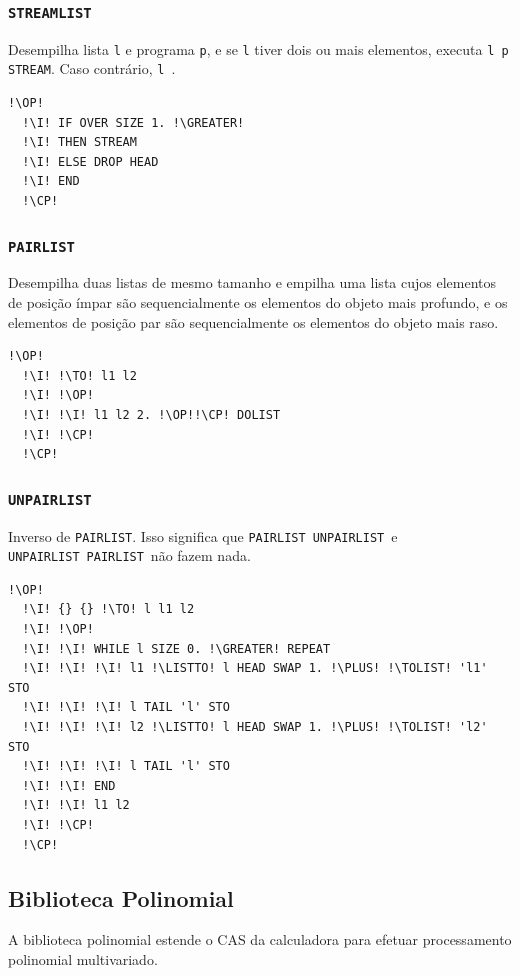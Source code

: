 \documentclass[12pt,a4paper]{report}
\newcommand{\kwd}[1]{\texttt{\textcolor{keyword}{#1}}}
\newcommand{\I}{\enspace\textcolor{indent}\vrule\hspace{2pt}}
\newcommand{\GREATER}{\kwd{$>$}}   %
\newcommand{\PLUS}{\kwd{+}}   %
\newcommand{\TOLIST}{\kwd{$\rightarrow$LIST}} %
\newcommand{\STREAM}{\kwd{STREAM}} %
\newcommand{\STREAMLIST}{\kwd{STREAMLIST}}   %
\newcommand{\PAIRLIST}{\kwd{PAIRLIST}}   %
\newcommand{\UNPAIRLIST}{\kwd{UNPAIRLIST}}   %
\newcommand{\OP}{\kwd{$\ll$}}   %
\newcommand{\CP}{\kwd{$\gg$}}   %
\newcommand{\TO}{\kwd{$\rightarrow$}} %
\numberwithin{theorem}{chapter}
\begin{document}
\subsubsection{\STREAMLIST}\label{STREAMLIST}
Desempilha lista \texttt{l} e programa \texttt{p}, e se \texttt{l}
tiver dois ou mais elementos, executa \texttt{l p \STREAM}.  Caso
contrário, \texttt{l \HEAD}.
\begin{lstlisting}[language=userrpl]
  !\OP!
  !\I! IF OVER SIZE 1. !\GREATER!
  !\I! THEN STREAM
  !\I! ELSE DROP HEAD
  !\I! END
  !\CP!
\end{lstlisting}

\subsubsection{\PAIRLIST}\label{PAIRLIST}
Desempilha duas listas de mesmo tamanho e empilha uma lista cujos
elementos de posição ímpar são sequencialmente os elementos do objeto
mais profundo, e os elementos de posição par são sequencialmente os
elementos do objeto mais raso.
\begin{lstlisting}[language=userrpl]
  !\OP!
  !\I! !\TO! l1 l2
  !\I! !\OP!
  !\I! !\I! l1 l2 2. !\OP!!\CP! DOLIST
  !\I! !\CP!
  !\CP!
\end{lstlisting}

\subsubsection{\UNPAIRLIST}\label{UNPAIRLIST}
Inverso de \PAIRLIST.  Isso significa que \PAIRLIST\ \UNPAIRLIST\ e
\UNPAIRLIST\ \PAIRLIST\ não fazem nada.
\begin{lstlisting}[language=userrpl]
  !\OP!
  !\I! {} {} !\TO! l l1 l2
  !\I! !\OP!
  !\I! !\I! WHILE l SIZE 0. !\GREATER! REPEAT
  !\I! !\I! !\I! l1 !\LISTTO! l HEAD SWAP 1. !\PLUS! !\TOLIST! 'l1' STO
  !\I! !\I! !\I! l TAIL 'l' STO
  !\I! !\I! !\I! l2 !\LISTTO! l HEAD SWAP 1. !\PLUS! !\TOLIST! 'l2' STO
  !\I! !\I! !\I! l TAIL 'l' STO
  !\I! !\I! END
  !\I! !\I! l1 l2
  !\I! !\CP!
  !\CP!
\end{lstlisting}

\subsection{Biblioteca Polinomial}

A biblioteca polinomial estende o CAS da calculadora para efetuar
processamento polinomial multivariado.
\end{document}
